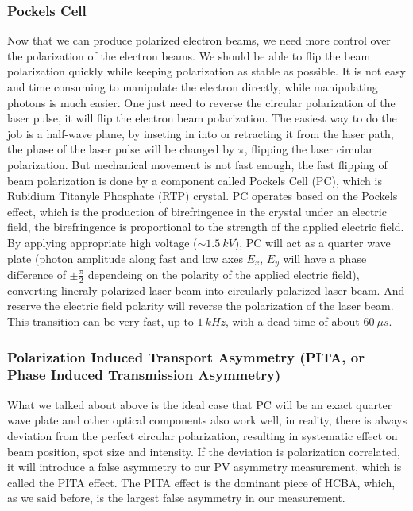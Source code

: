 \subsubsection{Pockels Cell}
Now that we can produce polarized electron beams, we need more control over the
polarization of the electron beams. We should be able to flip the beam polarization
quickly while keeping polarization as stable as possible. It is not easy and time
consuming to manipulate the electron directly, while manipulating photons is much 
easier. One just need to reverse the circular polarization of the laser pulse,
it will flip the electron beam polarization. The easiest way to do the job is
a half-wave plane, by inseting in into or retracting it from the laser path,
the phase of the laser pulse will be changed by $\pi$, flipping the laser
circular polarization. But mechanical movement is not fast enough, the fast 
flipping of beam polarization is done by a component called Pockels Cell (PC),
which is Rubidium Titanyle Phosphate (RTP) crystal. PC operates based on the 
Pockels effect, which is the production of birefringence in the crystal under
an electric field, the birefringence is proportional to the strength of the
applied electric field. By applying appropriate high voltage ($\sim 1.5\ kV$),
PC will act as a quarter wave plate (photon amplitude along fast and low axes
$E_x$, $E_y$ will have a phase difference of $\pm \frac{\pi}{2}$ dependeing on
the polarity of the applied electric field), converting lineraly polarized laser beam
into circularly polarized laser beam. And reserve the electric field polarity
will reverse the polarization of the laser beam. This transition can be very
fast, up to $1 \ kHz$, with a dead time of about $60\ \mu s$.

\subsubsection{Polarization Induced Transport Asymmetry (PITA, or Phase Induced Transmission Asymmetry) \cite{Cary2019}}
What we talked about above is the ideal case that PC will be an exact quarter wave
plate and other optical components also work well, in reality, there is always 
deviation from the perfect circular polarization,
resulting in systematic effect on beam position, spot size and intensity. If the deviation 
is polarization correlated, it will introduce a false asymmetry to our PV asymmetry 
measurement, which is called the PITA effect. The PITA effect is the dominant
piece of HCBA, which, as we said before, is the largest false asymmetry in
our measurement.

